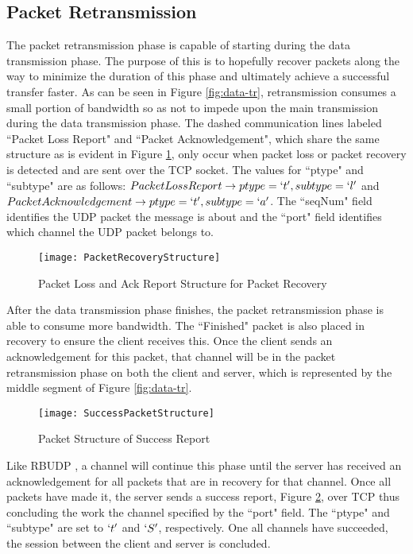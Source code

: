 \subsection{Packet Retransmission}\label{subsec:pack-retr}

The packet retransmission phase is capable of starting during the data transmission phase. The purpose of this is to hopefully recover packets along the way to minimize the duration of this phase and ultimately achieve a successful transfer faster. As can be seen in Figure \ref{fig:data-tr}, retransmission consumes a small portion of bandwidth so as not to impede upon the main transmission during the data transmission phase. The dashed communication lines labeled ``Packet Loss Report" and ``Packet Acknowledgement", which share the same structure as is evident in Figure \ref{fig:pack-rec-struct}, only occur when packet loss or packet recovery is detected and are sent over the TCP socket. The values for ``ptype" and ``subtype" are as follows: $Packet Loss Report \rightarrow ptype = \lq{t}\rq,subtype = \lq{l}\rq$ and $Packet Acknowledgement \rightarrow ptype = \lq{t}\rq,subtype = \lq{a}\rq$. The ``seqNum" field identifies the UDP packet the message is about and the ``port" field identifies which channel the UDP packet belongs to.

\begin{figure}[ht]
\centering
\texttt{[image: PacketRecoveryStructure]}
\caption{Packet Loss and Ack Report Structure for Packet Recovery}
\label{fig:pack-rec-struct}
\end{figure}

After the data transmission phase finishes, the packet retransmission phase is able to consume more bandwidth. The ``Finished" packet is also placed in recovery to ensure the client receives this. Once the client sends an acknowledgement for this packet, that channel will be in the packet retransmission phase on both the client and server, which is represented by the middle segment of Figure \ref{fig:data-tr}.

\begin{figure}[ht]
\centering
\texttt{[image: SuccessPacketStructure]}
\caption{Packet Structure of Success Report}
\label{fig:success-struct}
\end{figure}

Like RBUDP \cite{He2002}, a channel will continue this phase until the server has received an acknowledgement for all packets that are in recovery for that channel. Once all packets have made it, the server sends a success report, Figure \ref{fig:success-struct}, over TCP thus concluding the work the channel specified by the ``port" field. The ``ptype" and ``subtype" are set to $`t'$ and $`S'$, respectively. One all channels have succeeded, the session between the client and server is concluded.
